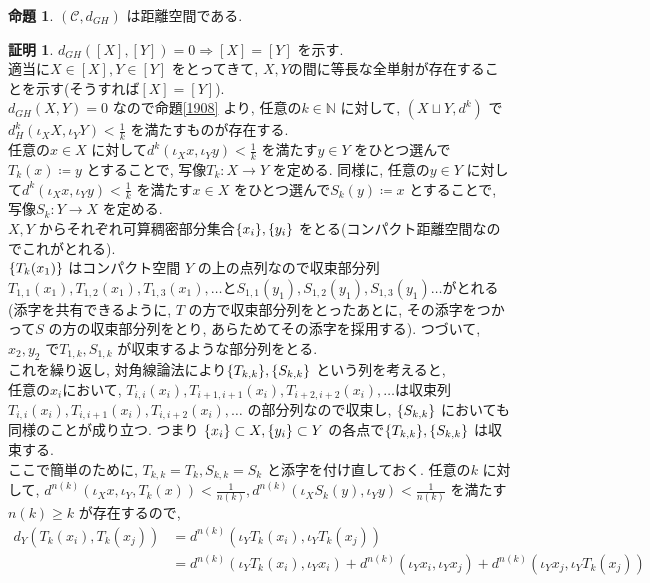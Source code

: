 \documentclass[10pt, fleqn, label-section=none, titlepage]{bxjsarticle}
\theoremstyle{definition}
\newtheorem{prop}[dfn]{命題}
\newtheorem*{pf*}{証明}
\newcommand{\cbra}[1]{\mleft\{#1\mright\}}
\newcommand{\naraba}{\Rightarrow}
\begin{document}
\begin{prop}
$(\mathcal{C}, d_{GH})$ は距離空間である.
\end{prop}
\begin{pf*}
$d_{GH}([X],[Y]) = 0 \naraba [X] = [Y]$ を示す. \\
適当に$X \in [X], Y \in [Y]$ をとってきて, $X,Y$の間に等長な全単射が存在することを示す(そうすれば$[X] = [Y] $).\\
$d_{GH}(X,Y) = 0$ なので命題\ref{1908} より, 任意の$k \in \mathbb{N}$ に対して, $(X\sqcup Y, d^k)$ で $d_H^k (\iota_X X, \iota_Y Y) < \frac{1}{k}$ を満たすものが存在する. \\
任意の$x \in X$ に対して$d^k(\iota_X x, \iota_Y y) < \frac{1}{k}$ を満たす$y \in Y$ をひとつ選んで$T_k (x) \coloneqq y$ とすることで, 写像$T_k: X \rightarrow  Y$ を定める. 
同様に, 任意の$y \in Y$ に対して$d^k(\iota_X x, \iota_Y y) < \frac{1}{k}$ を満たす$x \in X$ をひとつ選んで$S_k (y) \coloneqq x$ とすることで, 写像$S_k: Y \rightarrow X$ を定める. \\
$X,Y$ からそれぞれ可算稠密部分集合$\cbra{x_i}, \cbra{y_i}$ をとる(コンパクト距離空間なのでこれがとれる). \\
$\cbra{T_k(x_1)}$ はコンパクト空間 $Y$ の上の点列なので収束部分列$T_{1,1}(x_1), T_{1,2}(x_1), T_{1,3}(x_1), \ldots $と$S_{1,1}(y_1), S_{1,2}(y_1), S_{1,3}(y_1)\ldots $がとれる(添字を共有できるように, $T$ の方で収束部分列をとったあとに, その添字をつかって$S$ の方の収束部分列をとり, あらためてその添字を採用する). つづいて, $x_2, y_2$ で$T_{1,k}, S_{1,k}$ が収束するような部分列をとる. \\
これを繰り返し, 対角線論法により$\cbra{T_{k,k}}, \cbra{S_{k,k}}$ という列を考えると, \\
任意の$x_i$において, $T_{i,i}(x_i), T_{i+1,i+1}(x_i), T_{i+2,i+2}(x_i), \ldots $は収束列$T_{i,i}(x_i), T_{i,i+1}(x_i), T_{i,i+2}(x_i), \ldots $ の部分列なので収束し, $\cbra{S_{k,k}}$ においても同様のことが成り立つ. つまり $\cbra{x_i} \subset X, \cbra{y_i} \subset Y$ の各点で$\cbra{T_{k,k}}, \cbra{S_{k,k}}$ は収束する. \\
ここで簡単のために, $T_{k,k} = T_k, S_{k,k} = S_k$ と添字を付け直しておく. 
任意の$k$ に対して, $d^{n(k)} (\iota_X x, \iota_Y, T_k (x) ) < \frac{1}{n(k)} , d^{n(k)} (\iota_X S_k(y), \iota_Y  y ) < \frac{1}{n(k)}$ を満たす$n(k) \geq k$ が存在するので, 
\begin{align*}
d_Y (T_k(x_i), T_k(x_j) ) &= d^{n(k)} (\iota_Y T_k(x_i), \iota_Y T_k(x_j)) \\
&= d^{n(k)} (\iota_Y T_k(x_i), \iota_Y x_i )  + d^{n(k)} (\iota_Y x_i , \iota_Y x_j )  + d^{n(k)} (\iota_Y x_j , \iota_Y T_k(x_j) ) \\

\end{align*}
\end{pf*}
\end{document}
